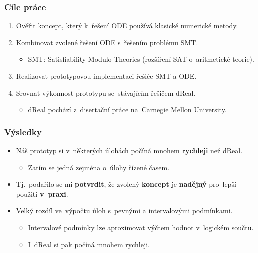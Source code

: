 \documentclass[t]{beamer}
\begin{document}

\begin{frame}\frametitle{Cíle práce}
\begin{enumerate}
\item Ověřit koncept, který k~řešení ODE používá
   klasické numerické metody.
\item Kombinovat zvolené řešení ODE s~řešením problému SMT.
   \begin{itemize}
   \item SMT: Satisfiability Modulo Theories
      (rozšíření SAT o~aritmetické teorie).
   \end{itemize}
\item Realizovat prototypovou implementaci řešiče SMT a ODE.
\item Srovnat výkonnost prototypu se~stávajícím řešičem dReal.
   \begin{itemize}
   \item dReal pochází z~disertační práce na~Carnegie Mellon University.
   \end{itemize}
\end{enumerate}
\end{frame}


\begin{frame}\frametitle{Výsledky}
\begin{itemize}
\item Náš prototyp si v~některých úlohách počíná mnohem \textbf{rychleji}
   než dReal.
   \begin{itemize}
   \item Zatím se jedná zejména o~úlohy řízené časem.
   \end{itemize}
\item Tj.~podařilo se mi \textbf{potvrdit},
   že zvolený \textbf{koncept} je \textbf{nadějný}
   pro~lepší použití \textbf{v~praxi}.
\item Velký rozdíl ve~výpočtu úloh s~pevnými a intervalovými podmínkami.
   \begin{itemize}
   \item Intervalové podmínky lze aproximovat výčtem hodnot v~logickém součtu.
   \item I~dReal si pak počíná mnohem rychleji.
   \end{itemize}
\end{itemize}
\end{frame}

\end{document}
